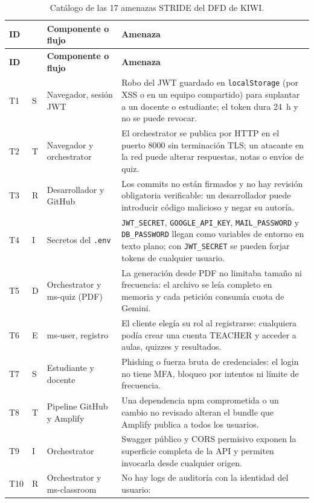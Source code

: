 \documentclass[12pt,a4paper]{article}
\begin{document}
{\small
\begin{longtable}{L{0.8cm}L{0.6cm}L{3.3cm}L{9.6cm}}
  \caption{Catálogo de las 17 amenazas STRIDE del DFD de KIWI.}\label{tab:catalogo}\\
  \toprule
  \textbf{ID} & & \textbf{Componente o flujo} & \textbf{Amenaza} \\
  \midrule
  \endfirsthead
  \toprule
  \textbf{ID} & & \textbf{Componente o flujo} & \textbf{Amenaza} \\
  \midrule
  \endhead
  \bottomrule
  \endfoot
  T1 & S & Navegador, sesión JWT & Robo del JWT guardado en \texttt{localStorage} (por XSS o en
  un equipo compartido) para suplantar a un docente o estudiante; el token dura 24~h y no se
  puede revocar. \\
  T2 & T & Navegador y orchestrator & El orchestrator se publica por HTTP en el puerto 8000 sin
  terminación TLS; un atacante en la red puede alterar respuestas, notas o envíos de quiz. \\
  T3 & R & Desarrollador y GitHub & Los commits no están firmados y no hay revisión obligatoria
  verificable: un desarrollador puede introducir código malicioso y negar su autoría. \\
  T4 & I & Secretos del \texttt{.env} & \texttt{JWT\_SECRET}, \texttt{GOOGLE\_API\_KEY},
  \texttt{MAIL\_PASSWORD} y \texttt{DB\_PASSWORD} llegan como variables de entorno en texto plano;
  con \texttt{JWT\_SECRET} se pueden forjar tokens de cualquier usuario. \\
  T5 & D & Orchestrator y ms-quiz (PDF) & La generación desde PDF no limitaba tamaño ni frecuencia:
  el archivo se leía completo en memoria y cada petición consumía cuota de Gemini. \\
  T6 & E & ms-user, registro & El cliente elegía su rol al registrarse: cualquiera podía crear
  una cuenta TEACHER y acceder a aulas, quizzes y resultados. \\
  T7 & S & Estudiante y docente & Phishing o fuerza bruta de credenciales: el login no tiene MFA,
  bloqueo por intentos ni límite de frecuencia. \\
  T8 & T & Pipeline GitHub y Amplify & Una dependencia npm comprometida o un cambio no revisado
  alteran el bundle que Amplify publica a todos los usuarios. \\
  T9 & I & Orchestrator & Swagger público y CORS permisivo exponen la superficie completa de la
  API y permiten invocarla desde cualquier origen. \\
  T10 & R & Orchestrator y ms-classroom & No hay logs de auditoría con la identidad del usuario:

\end{longtable}}
\end{document}
